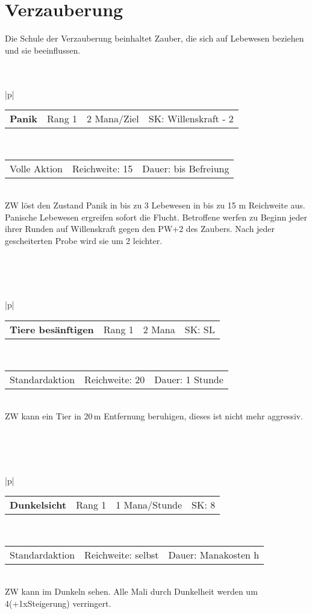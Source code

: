 \documentclass[../../Heldenanleitung2]{subfiles}
\begin{document}
\section{Verzauberung}
Die Schule der Verzauberung beinhaltet Zauber, die sich auf Lebewesen beziehen und sie beeinflussen.
\\\\\\
\begin{tabular}{|p{\textwidth}|}
\hline
\begin{tabularx}{\textwidth}{X|X|X|X}
\textbf{Panik} & Rang 1 & 2 Mana/Ziel & SK: Willenskraft - 2
\end{tabularx} \\ \hline
\begin{tabularx}{\textwidth}{X|X|X}
Volle Aktion & Reichweite: 15 & Dauer: bis Befreiung
\end{tabularx} \\ \hline
ZW löst den Zustand Panik in bis zu 3 Lebewesen in bis zu 15 m Reichweite aus. Panische Lebewesen ergreifen sofort die Flucht. Betroffene werfen zu Beginn jeder ihrer Runden auf Willenskraft gegen den PW+2 des Zaubers. Nach jeder gescheiterten Probe wird sie um 2 leichter.
\\ \hline
\end{tabular}
\\\\\\
\begin{tabular}{|p{\textwidth}|}
\hline
\begin{tabularx}{\textwidth}{X|X|X|X}
\textbf{Tiere besänftigen} & Rang 1 & 2 Mana & SK: SL
\end{tabularx} \\ \hline
\begin{tabularx}{\textwidth}{X|X|X}
Standardaktion & Reichweite: 20 & Dauer: 1 Stunde
\end{tabularx} \\ \hline
ZW kann ein Tier in 20\,m Entfernung beruhigen, dieses ist nicht mehr aggressiv.
\\ \hline
\end{tabular}
\\\\\\
\begin{tabular}{|p{\textwidth}|}
\hline
\begin{tabularx}{\textwidth}{X|X|X|X}
\textbf{Dunkelsicht} & Rang 1 & 1 Mana/Stunde & SK: 8
\end{tabularx} \\ \hline
\begin{tabularx}{\textwidth}{X|X|X}
Standardaktion & Reichweite: selbst & Dauer: Manakosten h
\end{tabularx} \\ \hline
ZW kann im Dunkeln sehen. Alle Mali durch Dunkelheit werden um 4(+1xSteigerung) verringert.
\\ \hline
\end{tabular}
\end{document}
